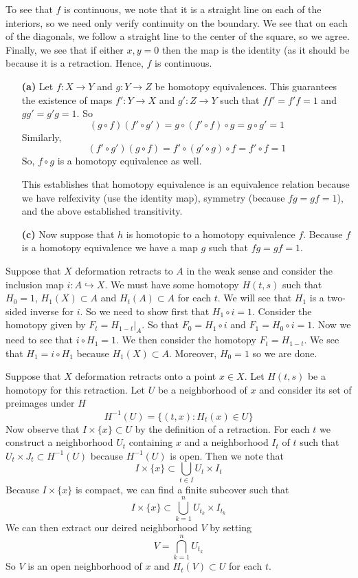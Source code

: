 \documentclass{article}
\DeclareMathOperator{\suchthat}{\mathrel{:}}
\DeclareMathOperator{\into}{\hookrightarrow}
\newcommand{\exercise}[1]{\noindent{\textbf{Exercise #1:}}}
\begin{document}
To see that $f$ is continuous, we note that it is a straight line on
each of the interiors, so we need only verify continuity on the
boundary. We see that on each of the diagonals, we follow a straight
line to the center of the square, so we agree. Finally, we see that if
either $x,y = 0$ then the map is the identity (as it should be because
it is a retraction. Hence, $f$ is continuous.

 \exercise{0.3}
\begin{enumerate}
\item[\textbf{(a)}] Let $f: X \to Y$ and $g: Y \to Z$ be homotopy
  equivalences. This guarantees the existence of maps $f': Y \to X$
  and $g': Z \to Y$ such that $ff' = f'f = 1$ and $gg' = g'g =
  1$. So
  \[
  (g \circ f)(f' \circ g') = g \circ (f' \circ f) \circ g = g \circ g' = 1
  \]
  Similarly,
  \[
  (f'\circ g')(g \circ f) = f' \circ (g' \circ g) \circ f = f' \circ f = 1
  \]
  So, $f\circ g$ is a homotopy equivalence as well.

  This establishes that homotopy equivalence is an equivalence
  relation because we have relfexivity (use the identity map),
  symmetry (because $fg = gf = 1$), and the above established
  transitivity.
\item[\textbf{(c)}] Now suppose that $h$ is homotopic to a homotopy
  equivalence $f$. Because $f$ is a homotopy equivalence we have a map
  $g$ such that $fg = gf = 1$.
\end{enumerate}

\exercise{0.4}

Suppose that $X$ deformation retracts to $A$ in the weak sense and
consider the inclusion map $i: A \into X$. We must have some homotopy
$H(t,s)$ such that $H_0 = 1$, $H_1(X) \subset A$ and $H_t(A) \subset
A$ for each $t$. We will see that $H_1$ is a two-sided inverse for
$i$. So we need to show first that $H_1 \circ i = 1$. Consider the
homotopy given by $F_t = H_{1-t}|_A$. So that $F_0 = H_1 \circ i$ and
$F_1 = H_0 \circ i = 1$. Now we need to see that $i \circ H_1 = 1$. We
then consider the homotopy $F_t = H_{1-t}$. We see that $H_1 = i \circ
H_1$ because $H_1(X) \subset A$. Moreover, $H_0 = 1$ so we are done.

\exercise{0.5}

Suppose that $X$ deformation retracts onto a point $x \in X$. Let
$H(t,s)$ be a homotopy for this retraction. Let $U$ be a neighborhood
of $x$ and consider its set of preimages under $H$
\[
H^{-1}(U) = \{(t,x) \suchthat H_t(x) \in U\}
\]
Now observe that $I \times \{x\} \subset U$ by the definition of a
retraction. For each $t$ we construct a neighborhood $U_t$ containing
$x$ and a neighborhood $I_t$ of $t$ such that $U_t \times J_t \subset
H^{-1}(U)$ because $H^{-1}(U)$ is open. Then we note that
\[
I \times \{x\} \subset \bigcup_{t \in I} U_t \times I_t
\]
Because $I \times \{x\}$ is compact, we can find a finite subcover
such that
\[
I \times \{x\} \subset \bigcup_{k=1}^n U_{t_k} \times I_{t_k}
\]
We can then extract our deired neighborhood $V$ by setting
\[
V = \bigcap_{k=1}^n U_{t_k}
\]
So $V$ is an open neighborhood of $x$ and $H_t(V) \subset U$ for each
$t$.
\end{document}
